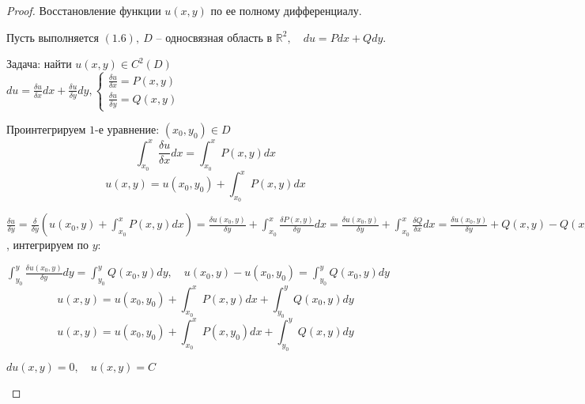 \documentclass{report}
\theoremstyle{definition}
\begin{document}
\begin{proof}
    Восстановление функции $u(x,y)$ по ее полному дифференциалу.

    Пусть выполняется $(1.6), \ D$ -- односвязная область в $\mathbb{R}^2, \quad du = Pdx + Qdy$.

    Задача: найти $u(x,y) \in C^2(D)$ \\

    $du = \frac{\delta u}{\delta x}dx + \frac{\delta u}{\delta y}dy, \left\{\begin{array}{l}
            \frac{\delta u}{\delta x} = P(x,y) \\
            \frac{\delta u}{\delta y} = Q(x,y)
        \end{array}\right.$

    Проинтегрируем $1$-е уравнение: $(x_0,y_0) \in D$
    \begin{equation*}
        \int_{x_0}^{x}\frac{\delta u}{\delta x}dx = \int_{x_0}^{x}P(x,y)dx
    \end{equation*}
    \begin{equation}
        u(x,y) = u(x_0,y_0) + \int_{x_0}^{x}P(x,y)dx
    \end{equation}

    $\frac{\delta u}{\delta y} = \frac{\delta}{\delta y}(u(x_0,y) + \int_{x_0}^{x}P(x,y)dx) = \frac{\delta u(x_0,y)}{\delta y} + \int_{x_0}^{x}\frac{\delta P(x,y)}{\delta y}dx = \frac{\delta u(x_0,y)}{\delta y} + \int_{x_0}^{x}\frac{\delta Q}{\delta x}dx = \frac{\delta u(x_0,y)}{\delta y} + Q(x,y) - Q(x_0,y) = Q(x,y) \implies \frac{\delta u(x_0,y)}{\delta y} = Q(x_0,y)$, интегрируем по $y$:

    $\int_{y_0}^{y}\frac{\delta u(x_0,y)}{\delta y}dy = \int_{y_0}^{y}Q(x_0,y)dy, \quad u(x_0,y) - u(x_0,y_0) = \int_{y_0}^{y}Q(x_0,y)dy$
    \begin{equation}
        u(x,y) = u(x_0,y_0) + \int_{x_0}^{x}P(x,y)dx + \int_{y_0}^{y}Q(x_0,y)dy
    \end{equation}
    \begin{equation}
        u(x,y) = u(x_0,y_0) + \int_{x_0}^{x}P(x,y_0)dx + \int_{y_0}^{y}Q(x,y)dy
    \end{equation}
    \begin{center}
        $du(x,y) = 0, \quad u(x,y) = C$
    \end{center}
\end{proof}
\end{document}
